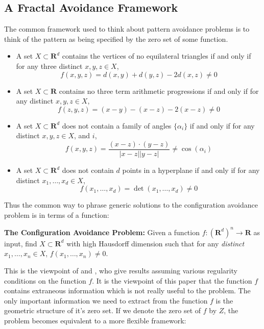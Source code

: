 \documentclass{article}
\theoremstyle{plain}
\theoremstyle{plain}
\begin{document}
\begin{multicols}{2}
\section{A Fractal Avoidance Framework}

The common framework used to think about pattern avoidance problems is to think of the pattern as being specified by the zero set of some function.
%
\begin{itemize}
	\item A set $X \subset \mathbf{R}^d$ contains the vertices of no equilateral triangles if and only if for any three distinct $x,y,z \in X$,
	\[ f(x,y,z) = d(x,y) + d(y,z) - 2d(x,z) \neq 0 \]

	\item A set $X \subset \mathbf{R}$ contains no three term arithmetic progressions if and only if for any distinct $x,y,z \in X$,
	\[ f(z,y,z) = (x - y) - (x - z) - 2(x - z) \neq 0 \]

	\item A set $X \subset \mathbf{R}^d$ does not contain a family of angles $\{ \alpha_i \}$ if and only if for any distinct $x,y,z \in X$, and $i$,
	\[ f(x,y,z) = \frac{(x - z) \cdot (y - z)}{|x - z||y - z|} \neq \cos(\alpha_i) \]

	\item A set $X \subset \mathbf{R}^d$ does not contain $d$ points in a hyperplane if and only if for any distinct $x_1, \dots, x_d \in X$,
	\[ f(x_1, \dots, x_d) = \det(x_1, \dots, x_d) \neq 0 \]
\end{itemize}
%
Thus the common way to phrase generic solutions to the configuration avoidance problem is in terms of a function:

\begin{changemargin}{0.5em}{0em}
{\bf The Configuration Avoidance Problem:} Given a function $f: (\mathbf{R}^d)^n \to \mathbf{R}$ as input, find $X \subset \mathbf{R}^d$ with high Hausdorff dimension such that for any {\it distinct} $x_1, \dots, x_n \in X$, $f(x_1, \dots, x_n) \neq 0$.
\end{changemargin}

This is the viewpoint of \cite{MalabikaRob} and \cite{Mathe}, who give results assuming various regularity conditions on the function $f$. It is the viewpoint of this paper that the function $f$ contains extraneous information which is not really useful to the problem. The only important information we need to extract from the function $f$ is the geometric structure of it's zero set. If we denote the zero set of $f$ by $Z$, the problem becomes equivalent to a more flexible framework:


\end{multicols}
\end{document}
